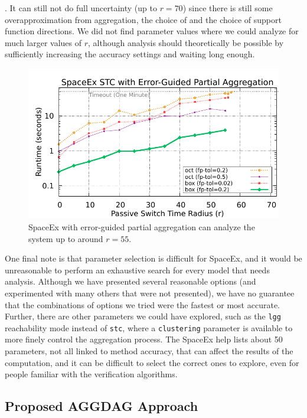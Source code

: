 .
%
It can still not do full uncertainty (up to $r=70$) since there is still some overapproximation from aggregation, the choice of  and the
choice of support function directions.
%
We did not find parameter values where we could analyze for much larger values of $r$,
although analysis should theoretically be possible by sufficiently increasing the accuracy settings and waiting long enough.

\begin{figure}[t]
\centerline{\includegraphics[width=0.9\columnwidth]{images/unagg.pdf}}
\caption{SpaceEx with error-guided partial aggregation can analyze the system up to around $r=55$.}
\label{fig:spaceex_unagg}
\end{figure}

One final note is that parameter selection is difficult for SpaceEx, and it would be unreasonable to perform an exhaustive search for every model
that needs analysis.
%
Although we have presented several reasonable options (and experimented with many others that were not presented), we have no guarantee that
the combinations of options we tried were the fastest or most accurate.
%
Further, there are other parameters we could have explored, such as the \texttt{lgg} reachability mode instead of \texttt{stc}, where a \texttt{clustering}
parameter is available to more finely control the aggregation process.
%
The SpaceEx help lists about 50 parameters, not all linked to method accuracy, that can affect the results of the computation,
and it can be difficult to select the correct ones to explore, even for people familiar with the verification algorithms.

\subsection{Proposed AGGDAG Approach}

